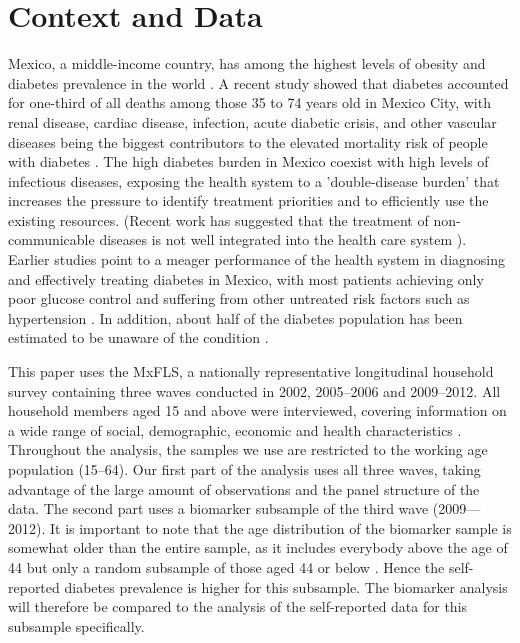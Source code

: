 \documentclass[12pt,english]{article}
\begin{document}
\section{\label{sec:Data}Context and Data}

Mexico, a middle-income country, has among the highest levels of obesity and diabetes prevalence in the world \parencite{InternationalDiabetesFederation2015,WorldHealthOrganization2011}. A recent study showed that diabetes accounted for one-third of all deaths among those 35 to 74 years old in Mexico City, with renal disease, cardiac disease, infection, acute diabetic crisis, and other vascular diseases being the biggest contributors to the elevated mortality risk of people with diabetes \parencite{Alegre-Diaz2016}. The high diabetes burden in Mexico coexist with high levels of infectious diseases, exposing the health system to a 'double-disease burden' that increases the pressure to identify treatment priorities and to efficiently use the existing resources. (Recent work has suggested that the treatment of non-communicable diseases is not well integrated into the health care system \parencite{Gutierrez-delgado2009}). Earlier studies point to a meager performance of the health system in diagnosing and effectively treating diabetes in Mexico, with most patients achieving only poor glucose control and suffering from other untreated risk factors such as hypertension \parencite{Alegre-Diaz2016,Flores-Hernandez2015}. In addition, about half of the diabetes population has been estimated to be unaware of the condition \parencite{Barquera2013}.

This paper uses the \acf{MxFLS}, a nationally representative longitudinal household survey containing three waves conducted in 2002, 2005--2006 and 2009--2012. All household members aged 15 and above were interviewed, covering information on a wide range of social, demographic, economic and health characteristics \parencite{Rubalcava2013}. Throughout the analysis, the samples we use are restricted to the working age population (15--64). Our first part of the analysis uses all three waves, taking advantage of the large amount of observations and the panel structure of the data. The second part uses a biomarker subsample of the third wave (2009---2012). It is important to note that the age distribution of the biomarker sample is somewhat older than the entire sample, as it includes everybody above the age of 44 but only a random subsample of those aged 44 or below \parencite{Crimmins2015}. Hence the self-reported diabetes prevalence is higher for this subsample. The biomarker analysis will therefore be compared to the analysis of the self-reported data for this subsample specifically.
\end{document}
